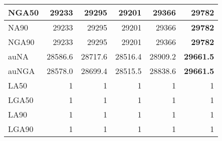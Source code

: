 \documentclass[12pt,a4paper]{article}
\begin{document}
\begin{table}[ht]
\begin{center}
\begin{tabular}{|l*{5}{|r}|}
NGA50 & 29233 & 29295 & 29201 & 29366 & {\bf 29782} \\ \hline
NA90 & 29233 & 29295 & 29201 & 29366 & {\bf 29782} \\ \hline
NGA90 & 29233 & 29295 & 29201 & 29366 & {\bf 29782} \\ \hline
auNA & 28586.6 & 28717.6 & 28516.4 & 28909.2 & {\bf 29661.5} \\ \hline
auNGA & 28578.0 & 28699.4 & 28515.5 & 28838.6 & {\bf 29661.5} \\ \hline
LA50 & 1 & 1 & 1 & 1 & 1 \\ \hline
LGA50 & 1 & 1 & 1 & 1 & 1 \\ \hline
LA90 & 1 & 1 & 1 & 1 & 1 \\ \hline
LGA90 & 1 & 1 & 1 & 1 & 1 \\ \hline
\end{tabular}
\end{center}
\end{table}
\end{document}
